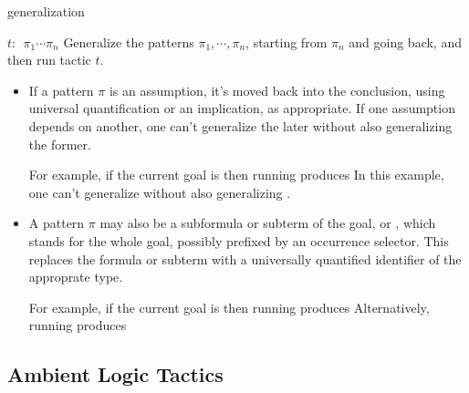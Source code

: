 \begin{tactic}[$t$: $\;\pi_1 \cdots \pi_n$]{generalization}
  \begin{tsyntax}[empty]{$t$: $\;\pi_1 \cdots \pi_n$}
    Generalize the patterns $\pi_1, \cdots, \pi_n$, starting from
    $\pi_n$ and going back, and then run tactic $t$.

    \begin{itemize}
    \item If a pattern $\pi$ is an assumption, it's moved back into
      the conclusion, using universal quantification or an
      implication, as appropriate. If one assumption depends on
      another, one can't generalize the later without also
      generalizing the former.

      For example, if the current goal is
       then
      running 
      produces
       In
      this example, one can't generalize  without also
      generalizing .

    \item A pattern $\pi$ may also be a subformula or subterm of the
      goal, or \ec{_}, which stands for the whole goal, possibly
      prefixed by an occurrence selector. This replaces the formula or
      subterm with a universally quantified identifier of the
      approprate type.

      For example, if the current goal is
       then
      running 
      produces
      Alternatively, running
      produces
    \end{itemize}
  \end{tsyntax}
\end{tactic}

\subsection{Ambient Logic Tactics}












